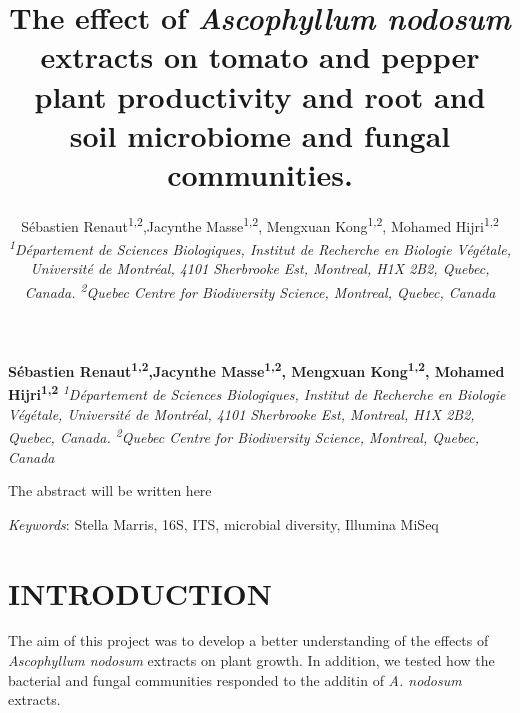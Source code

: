 \documentclass[11pt,]{article}
\title{\textbf{The effect of \emph{Ascophyllum nodosum} extracts on tomato and
pepper plant productivity and root and soil microbiome and fungal
communities.}  }
\author{\Large Sébastien Renaut\textsuperscript{1,2},Jacynthe
Masse\textsuperscript{1,2}, Mengxuan Kong\textsuperscript{1,2}, Mohamed
Hijri\textsuperscript{1,2}\vspace{0.05in} \newline\normalsize\emph{\textsuperscript{1}Département de Sciences Biologiques, Institut de
Recherche en Biologie Végétale, Université de Montréal, 4101 Sherbrooke
Est, Montreal, H1X 2B2, Quebec, Canada. \textsuperscript{2}Quebec Centre
for Biodiversity Science, Montreal, Quebec, Canada}  }
\date{}
\newcommand*{\authorfont}{\fontfamily{phv}\selectfont}
\renewenvironment{abstract}
 {{%
    \setlength{\leftmargin}{0mm}
    \setlength{\rightmargin}{\leftmargin}%
  }%
  \relax}
 {\endlist}
\begin{document}
	
%

{%
\setlength{\parindent}{0pt}
\thispagestyle{plain}
{\fontsize{18}{20}\selectfont\raggedright 
\maketitle  %

}

{
   \vskip 13.5pt\relax \normalsize\fontsize{11}{12} 
\textbf{\authorfont Sébastien Renaut\textsuperscript{1,2},Jacynthe
Masse\textsuperscript{1,2}, Mengxuan Kong\textsuperscript{1,2}, Mohamed
Hijri\textsuperscript{1,2}} \hskip 15pt \emph{\small \textsuperscript{1}Département de Sciences Biologiques, Institut de
Recherche en Biologie Végétale, Université de Montréal, 4101 Sherbrooke
Est, Montreal, H1X 2B2, Quebec, Canada. \textsuperscript{2}Quebec Centre
for Biodiversity Science, Montreal, Quebec, Canada}   

}

}








\begin{abstract}

    \hbox{\vrule height .2pt width 39.14pc}

    \vskip 8.5pt %

\noindent The abstract will be written here


\vskip 8.5pt \noindent \emph{Keywords}: Stella Marris, 16S, ITS, microbial diversity, Illumina MiSeq \par

    \hbox{\vrule height .2pt width 39.14pc}



\end{abstract}


\vskip 6.5pt


\noindent \doublespacing \newpage 

\section{INTRODUCTION}\label{introduction}

The aim of this project was to develop a better understanding of the
effects of \emph{Ascophyllum nodosum} extracts on plant growth. In
addition, we tested how the bacterial and fungal communities responded
to the additin of \emph{A. nodosum} extracts. ~\\
\hspace*{0.333em}
\end{document}
